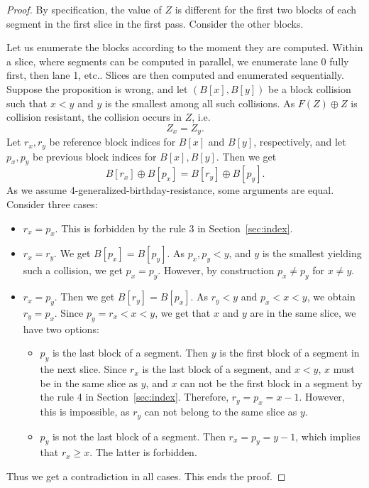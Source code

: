 \documentclass[a4paper]{article}
\begin{document}
\begin{proof}
    By specification, the value of $Z$ is different for the first two blocks of each segment in the first slice in the first pass. Consider the other blocks.

  Let us enumerate the blocks according to the moment they are computed. Within a slice, where segments can be computed in parallel, we enumerate lane 0 fully first, then lane 1, etc.. Slices are then computed and enumerated sequentially.
  Suppose the proposition is wrong, and  let $(B[x],B[y])$ be a block collision such that $x<y$ and $y$ is the smallest among all such collisions. As $F(Z)\oplus Z$ is collision resistant,
  the collision occurs in $Z$, i.e.
  $$
  Z_x = Z_y.
  $$
  Let $r_x, r_y$ be reference block indices for $B[x]$ and $B[y]$, respectively, and let $p_x, p_y$ be previous block indices for $B[x],B[y].$ Then we get
  $$
  B[r_x] \oplus B[p_x] = B[r_y] \oplus B[p_y].
  $$
  As we assume 4-generalized-birthday-resistance, some arguments are equal. Consider three cases:
  \begin{itemize}
    \item $r_x=p_x$. This is forbidden by the rule 3 in Section~\ref{sec:index}.
    \item $r_x=r_y$.  We get $B[p_x] =  B[p_y]$. As $p_x,p_y <y$, and $y$ is the smallest yielding such a collision, we get $p_x = p_y$. However, by construction $p_x \neq p_y$ for $x\neq y$.
    \item $r_x = p_y$. Then we get $B[r_y] = B[p_x]$. As $r_y <y$ and $p_x<x<y$, we obtain $r_y = p_x$. Since $p_y=r_x<x<y$, we get that $x$ and $y$ are in the same slice, we have two options:
    \begin{itemize}
    \item $p_y$ is the last block of a segment. Then $y$ is the first block of a segment in the next slice. Since $r_x$ is the last block of a segment, and $x<y$, $x$ must be in the   same slice as $y$, and $x$ can not be the first block in a segment by the rule 4 in Section~\ref{sec:index}. Therefore, $r_y=p_x = x-1$. However, this is impossible, as $r_y$ can not belong to the same slice as $y$.
        \item $p_y$ is not the last block of a segment. Then $r_x = p_y = y-1$, which implies that $r_x \geq x$. The latter is forbidden.
    \end{itemize}
  \end{itemize}
  Thus we get a contradiction in all cases. This ends the proof.
\end{proof}
\end{document}
